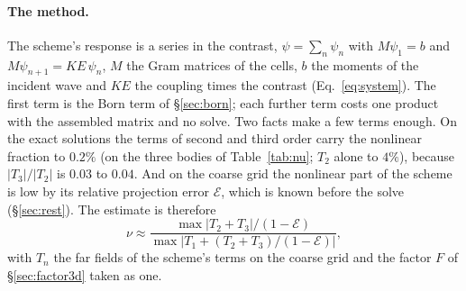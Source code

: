 \documentclass[11pt,a4paper]{article}
\newcommand{\cE}{\mathcal{E}}
\begin{document}
\paragraph{The method.} The scheme's response is a series in the contrast, $\psi=\sum_n\psi_n$ with
$M\psi_1=b$ and $M\psi_{n+1}=KE\,\psi_n$, $M$ the Gram matrices of the cells, $b$ the moments of the
incident wave and $KE$ the coupling times the contrast (Eq.~\eqref{eq:system}). The first term is the
Born term of \S\ref{sec:born}; each further term costs one product with the assembled matrix and no
solve. Two facts make a few terms enough. On the exact solutions the terms of second and third order
carry the nonlinear fraction to $0.2\%$ (on the three bodies of Table~\ref{tab:nu}; $T_2$ alone to
$4\%$), because $\lvert T_3\rvert/\lvert T_2\rvert$ is $0.03$ to $0.04$. And on the coarse grid the
nonlinear part of the scheme is low by its relative projection error $\cE$, which is known before the
solve (\S\ref{sec:rest}). The estimate is therefore
\begin{equation}\label{eq:nuest}
  \nu\approx\frac{\max\lvert T_2+T_3\rvert/(1-\cE)}{\max\bigl\lvert T_1+(T_2+T_3)/(1-\cE)\bigr\rvert},
\end{equation}
with $T_n$ the far fields of the scheme's terms on the coarse grid and the factor $F$ of
\S\ref{sec:factor3d} taken as one.
\end{document}
